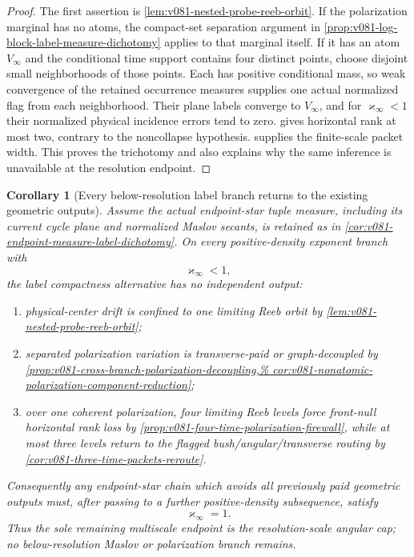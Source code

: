 \documentclass[10pt]{article}
\newtheorem{corollary}[theorem]{Corollary}
\begin{document}
\begin{proof}
The first assertion is \cref{lem:v081-nested-probe-reeb-orbit}.  If the polarization marginal has
no atoms, the compact-set separation argument in
\cref{prop:v081-log-block-label-measure-dichotomy} applies to that marginal itself.  If it has an
atom \(V_\infty\) and the conditional time support contains four distinct points, choose disjoint
small neighborhoods of those points.  Each has positive conditional mass, so weak convergence of
the retained occurrence measures supplies one actual normalized flag from each neighborhood.
Their plane labels converge to \(V_\infty\), and for
\(\varkappa_\infty<1\) their normalized physical incidence errors tend to zero.   gives horizontal rank at most two, contrary to the
noncollapse hypothesis.   supplies the
finite-scale packet width.  This proves the trichotomy and also explains why the same inference is
unavailable at the resolution endpoint.
\end{proof}

\begin{corollary}[Every below-resolution label branch returns to the existing geometric outputs]
\label{cor:v081-below-resolution-label-closure}
Assume the actual endpoint-star tuple measure, including its current cycle plane and normalized
Maslov secants, is retained as in
\cref{cor:v081-endpoint-measure-label-dichotomy}.  On every positive-density exponent branch with
\[
\varkappa_\infty<1,
\]
the label compactness alternative has no independent output:
\begin{enumerate}[label=\textnormal{(\roman*)}]
\item physical-center drift is confined to one limiting Reeb orbit by
\cref{lem:v081-nested-probe-reeb-orbit};
\item separated polarization variation is transverse-paid or graph-decoupled by
\cref{prop:v081-cross-branch-polarization-decoupling,%
cor:v081-nonatomic-polarization-component-reduction};
\item over one coherent polarization, four limiting Reeb levels force front-null horizontal rank
loss by \cref{prop:v081-four-time-polarization-firewall}, while at most three levels return to the
flagged bush/angular/transverse routing by
\cref{cor:v081-three-time-packets-reroute}.
\end{enumerate}
Consequently any endpoint-star chain which avoids all previously paid geometric outputs must, after
passing to a further positive-density subsequence, satisfy
\[
\boxed{\varkappa_\infty=1.}
\]
Thus the sole remaining multiscale endpoint is the resolution-scale angular cap; no
below-resolution Maslov or polarization branch remains.
\end{corollary}
\end{document}
